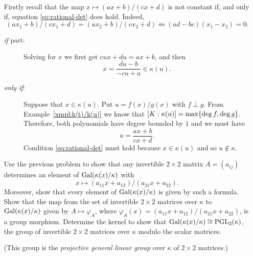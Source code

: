 \begin{solution}
    Firstly recall that the map $x\mapsto(ax+b)/(cx+d)$ is not constant if, and only if, equation \eqref{eq:rational-det} does hold. Indeed,
    $$
        (ax_1+b)/(cx_1+d) = (ax_2+b)/(cx_2+d) \iff (ad-bc)(x_1-x_2)=0.
    $$
    \begin{description}
        \item[\rm\textit{if\/ }part:] Solving for $x$ we first get $cux+du=ax+b$, and then
        $$
            x = \frac{du-b}{-cu+a} \in \kappa(u).
        $$

        \item[\rm\textit{only if\/}:] Suppose that $x\in \kappa(u)$. Put $u=f(x)/g(x)$ with $f\perp g$. From Example~\ref{xmpl:k(t)/k(u)} we know that $[K:\kappa(u)]=\max\{\deg f,\deg g\}$. Therefore, both polynomials have degree bounded by $1$ and we must have
        $$
            u = \frac{ax+b}{cx+d}.
        $$
        Condition \eqref{eq:rational-det} must hold because $x\in\kappa(u)$ and so $u\notin\kappa$.
    \end{description}
\end{solution}

\begin{probl}
    Use the previous problem to show that any invertible\/ $2\times2$ matrix\/ $A=(a_{ij})$ determines an element of\/ $\operatorname{Gal}(\kappa(x)/\kappa)$ with
    $$
        x\mapsto(a_{11}x + a_{12})/(a_{21}x+a_{22}).
    $$
    Moreover, show that every element of\/ $\operatorname{Gal}(\kappa(x)/\kappa)$ is given by such a formula. Show that the map from the set of invertible\/ $2\times2$ matrices over\/ $\kappa$ to\/ $\operatorname{Gal}(\kappa(x)/\kappa)$ given by\/ $A\mapsto\varphi_A$, where\/ $\varphi_A(x) = (a_{11}x + a_{12})/(a_{21}x + a_{22})$, is a group morphism. Determine the  kernel to show that\/ $\operatorname{Gal}(\kappa(x)/\kappa)\cong\operatorname{PGL}_2(\kappa)$, the group of invertible\/ $2\times2$ matrices over\/ $\kappa$ modulo the scalar matrices. 

    \textrm{\rm(This group is the \textsl{projective general linear group} over $\kappa$ of $2\times2$ matrices.)}
\end{probl}

